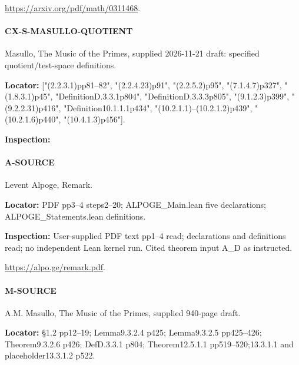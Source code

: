 \documentclass[11pt,a4paper]{article}
\begin{document}
\url{https://arxiv.org/pdf/math/0311468}.

\paragraph{CX-S-MASULLO-QUOTIENT} Masullo, The Music of the Primes, supplied 2026-11-21 draft:\allowbreak{} specified quotient/\allowbreak{}test-space definitions.

\textbf{Locator:} ["(2.\allowbreak{}2.\allowbreak{}3.\allowbreak{}1)pp81–\allowbreak{}82", "(2.\allowbreak{}2.\allowbreak{}4.\allowbreak{}23)p91", "(2.\allowbreak{}2.\allowbreak{}5.\allowbreak{}2)p95", "(7.\allowbreak{}1.\allowbreak{}4.\allowbreak{}7)p327", "(1.\allowbreak{}8.\allowbreak{}3.\allowbreak{}1)p45", "DefinitionD.\allowbreak{}3.\allowbreak{}3.\allowbreak{}1p804", "DefinitionD.\allowbreak{}3.\allowbreak{}3.\allowbreak{}3p805", "(9.\allowbreak{}1.\allowbreak{}2.\allowbreak{}3)p399", "(9.\allowbreak{}2.\allowbreak{}2.\allowbreak{}31)p416", "Definition10.\allowbreak{}1.\allowbreak{}1.\allowbreak{}1p434", "(10.\allowbreak{}2.\allowbreak{}1.\allowbreak{}1)–\allowbreak{}(10.\allowbreak{}2.\allowbreak{}1.\allowbreak{}2)p439", "(10.\allowbreak{}2.\allowbreak{}1.\allowbreak{}6)p440", "(10.\allowbreak{}4.\allowbreak{}1.\allowbreak{}3)p456"].

\textbf{Inspection:} 


\paragraph{A-SOURCE} Levent Alpoge, Remark.

\textbf{Locator:} PDF pp3–\allowbreak{}4 steps2–\allowbreak{}20; ALPOGE\_\allowbreak{}Main.\allowbreak{}lean five declarations; ALPOGE\_\allowbreak{}Statements.\allowbreak{}lean definitions.

\textbf{Inspection:} User-supplied PDF text pp1–\allowbreak{}4 read; declarations and definitions read; no independent Lean kernel run.\allowbreak{} Cited theorem input A\_\allowbreak{}D as instructed.\allowbreak{}

\url{https://alpo.ge/remark.pdf}.

\paragraph{M-SOURCE} A.\allowbreak{}M.\allowbreak{} Masullo, The Music of the Primes, supplied 940-page draft.

\textbf{Locator:} §1.\allowbreak{}2 pp12–\allowbreak{}19; Lemma9.\allowbreak{}3.\allowbreak{}2.\allowbreak{}4 p425; Lemma9.\allowbreak{}3.\allowbreak{}2.\allowbreak{}5 pp425–\allowbreak{}426; Theorem9.\allowbreak{}3.\allowbreak{}2.\allowbreak{}6 p426; DefD.\allowbreak{}3.\allowbreak{}3.\allowbreak{}1 p804; Theorem12.\allowbreak{}5.\allowbreak{}1.\allowbreak{}1 pp519–\allowbreak{}520;13.\allowbreak{}3.\allowbreak{}1.\allowbreak{}1 and placeholder13.\allowbreak{}3.\allowbreak{}1.\allowbreak{}2 p522.
\end{document}
